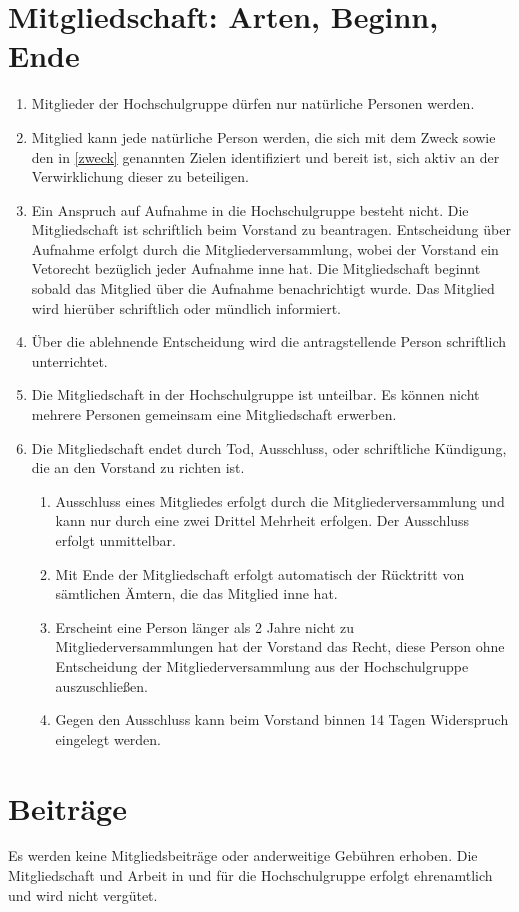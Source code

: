 \documentclass[11pt]{article}
\begin{document}
\section{Mitgliedschaft: Arten, Beginn, Ende}
\begin{enumerate}
	\item Mitglieder der Hochschulgruppe dürfen nur natürliche Personen werden.
	\item Mitglied kann jede natürliche Person werden, die sich mit dem Zweck sowie den in \ref{zweck} genannten Zielen identifiziert und bereit ist, sich aktiv an der Verwirklichung dieser zu beteiligen.
	\item Ein Anspruch auf Aufnahme in die Hochschulgruppe besteht nicht. Die Mitgliedschaft ist
	      schriftlich beim Vorstand zu beantragen. Entscheidung über Aufnahme erfolgt durch die Mitgliederversammlung, wobei der Vorstand ein Vetorecht bezüglich jeder Aufnahme inne hat. Die Mitgliedschaft beginnt sobald das Mitglied über die Aufnahme benachrichtigt wurde. Das Mitglied wird hierüber schriftlich oder mündlich informiert.
	\item Über die ablehnende Entscheidung wird die antragstellende Person schriftlich unterrichtet.
	\item Die Mitgliedschaft in der Hochschulgruppe ist unteilbar. Es können nicht mehrere Personen
	      gemeinsam eine Mitgliedschaft erwerben.
	\item Die Mitgliedschaft endet durch Tod, Ausschluss, oder schriftliche Kündigung, die an den Vorstand zu richten ist.
	      \begin{enumerate}
		      \item Ausschluss eines Mitgliedes erfolgt durch die Mitgliederversammlung und kann nur durch eine zwei Drittel Mehrheit erfolgen. Der Ausschluss erfolgt unmittelbar.
		      \item Mit Ende der Mitgliedschaft erfolgt automatisch der Rücktritt von sämtlichen Ämtern, die das Mitglied inne hat.
		      \item Erscheint eine Person länger als 2 Jahre nicht zu Mitgliederversammlungen hat der Vorstand das Recht, diese Person ohne Entscheidung der Mitgliederversammlung aus der Hochschulgruppe auszuschließen.
		      \item Gegen den Ausschluss kann beim Vorstand binnen 14 Tagen Widerspruch eingelegt werden.
	      \end{enumerate}
\end{enumerate}

\section{Beiträge}
Es werden keine Mitgliedsbeiträge oder anderweitige Gebühren erhoben. Die Mitgliedschaft und Arbeit in und für die Hochschulgruppe erfolgt ehrenamtlich und wird nicht vergütet.
\end{document}
